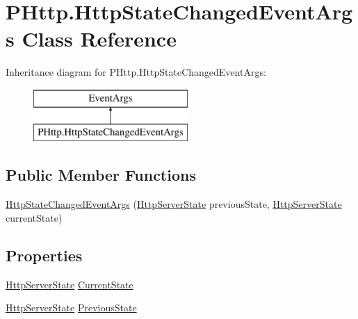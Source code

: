 \hypertarget{class_p_http_1_1_http_state_changed_event_args}{}\section{P\+Http.\+Http\+State\+Changed\+Event\+Args Class Reference}
\label{class_p_http_1_1_http_state_changed_event_args}
Inheritance diagram for P\+Http.\+Http\+State\+Changed\+Event\+Args\+:\begin{figure}[H]
\begin{center}
\leavevmode
\includegraphics[height=2.000000cm]{class_p_http_1_1_http_state_changed_event_args}
\end{center}
\end{figure}
\subsection*{Public Member Functions}
\begin{DoxyCompactItemize}
\item 
\hyperlink{class_p_http_1_1_http_state_changed_event_args_a45d4fbf7668943f06de124338619a2a7}{Http\+State\+Changed\+Event\+Args} (\hyperlink{namespace_p_http_a8a92bffd93830785b58d0be3a2f5fdd4}{Http\+Server\+State} previous\+State, \hyperlink{namespace_p_http_a8a92bffd93830785b58d0be3a2f5fdd4}{Http\+Server\+State} current\+State)
\end{DoxyCompactItemize}
\subsection*{Properties}
\begin{DoxyCompactItemize}
\item 
\hyperlink{namespace_p_http_a8a92bffd93830785b58d0be3a2f5fdd4}{Http\+Server\+State} \hyperlink{class_p_http_1_1_http_state_changed_event_args_aa98eb3cb34f31c90fcc1ee99cb5b4726}{Current\+State}
\item 
\hyperlink{namespace_p_http_a8a92bffd93830785b58d0be3a2f5fdd4}{Http\+Server\+State} \hyperlink{class_p_http_1_1_http_state_changed_event_args_a3628b07b237a39f93817d7c79d6315a4}{Previous\+State}
\end{DoxyCompactItemize}


